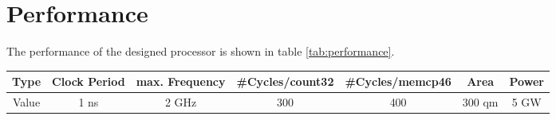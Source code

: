 \section{Performance}

The performance of the designed processor is shown in table \ref{tab:performance}.

\centering
\begin{tabular}{|c|c|c|c|c|c|c|}
\hline 
Type & Clock Period & max. Frequency & \#Cycles/count32 & \#Cycles/memcp46
& Area & Power \\ 
\hline 
Value & 1 ns & 2 GHz & 300 & 400 & 300 qm & 5 GW \\ 
\hline 
\end{tabular} 
\label{tab:performance}
